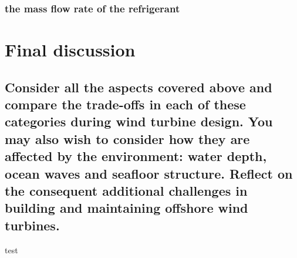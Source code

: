 \documentclass[12pt]{article}
\numberwithin{equation}{section}
\begin{document}
\begin{flushleft}
\subsubsection{the mass flow rate of the refrigerant}

\section{Final discussion}
\subsection{Consider all the aspects covered above and compare the trade-offs in each of these categories during wind turbine design. You may also wish to consider how they are affected by the environment: water depth, ocean waves and seafloor structure. Reflect on the consequent additional challenges in building and maintaining offshore wind turbines.}
test



\end{flushleft}
\end{document}
